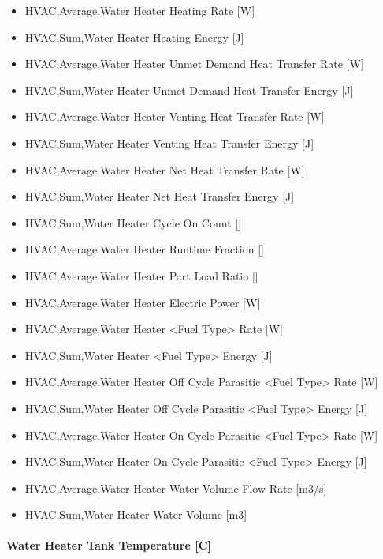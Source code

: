 \begin{itemize}
\item
  HVAC,Average,Water Heater Heating Rate {[}W{]}
\item
  HVAC,Sum,Water Heater Heating Energy {[}J{]}
\item
  HVAC,Average,Water Heater Unmet Demand Heat Transfer Rate {[}W{]}
\item
  HVAC,Sum,Water Heater Unmet Demand Heat Transfer Energy {[}J{]}
\item
  HVAC,Average,Water Heater Venting Heat Transfer Rate {[}W{]}
\item
  HVAC,Sum,Water Heater Venting Heat Transfer Energy {[}J{]}
\item
  HVAC,Average,Water Heater Net Heat Transfer Rate {[}W{]}
\item
  HVAC,Sum,Water Heater Net Heat Transfer Energy {[}J{]}
\item
  HVAC,Sum,Water Heater Cycle On Count {[]}
\item
  HVAC,Average,Water Heater Runtime Fraction {[]}
\item
  HVAC,Average,Water Heater Part Load Ratio {[]}
\item
  HVAC,Average,Water Heater Electric Power {[}W{]}
\item
  HVAC,Average,Water Heater \textless{}Fuel Type\textgreater{} Rate {[}W{]}
\item
  HVAC,Sum,Water Heater \textless{}Fuel Type\textgreater{} Energy {[}J{]}
\item
  HVAC,Average,Water Heater Off Cycle Parasitic \textless{}Fuel Type\textgreater{} Rate {[}W{]}
\item
  HVAC,Sum,Water Heater Off Cycle Parasitic \textless{}Fuel Type\textgreater{} Energy {[}J{]}
\item
  HVAC,Average,Water Heater On Cycle Parasitic \textless{}Fuel Type\textgreater{} Rate {[}W{]}
\item
  HVAC,Sum,Water Heater On Cycle Parasitic \textless{}Fuel Type\textgreater{} Energy {[}J{]}
\item
  HVAC,Average,Water Heater Water Volume Flow Rate {[}m3/s{]}
\item
  HVAC,Sum,Water Heater Water Volume {[}m3{]}
\end{itemize}

\paragraph{Water Heater Tank Temperature {[}C{]}}\label{water-heater-tank-temperature-c}

